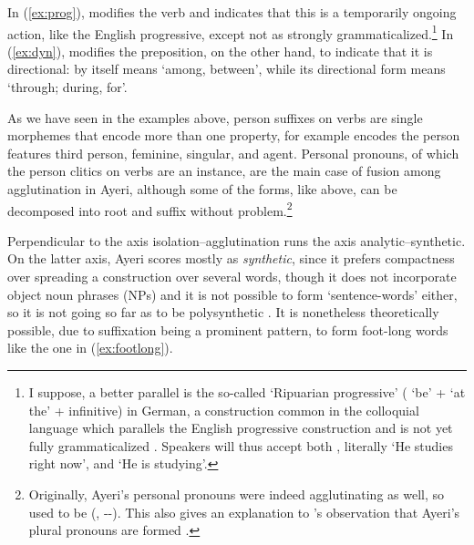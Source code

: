 In (\ref{ex:prog}),  modifies the verb 
and indicates that this is a temporarily ongoing action, like the English
progressive, except not as strongly grammaticalized.\footnote{I suppose, a
better parallel is the so-called  `Ripuarian
progressive' ( `be' +  `at the' + infinitive) in German, a
construction common in the colloquial language which parallels the English
progressive construction and is not yet fully grammaticalized
\citep[435]{dudengram2016}. Speakers will thus accept both , literally `He studies right now', and  `He is
studying'.
% 
}
%
In (\ref{ex:dyn}),  modifies the preposition, on the other
hand, to indicate that it is directional:  by itself means
`among, between', while its directional form  means
`through; during, for'.

As we have seen in the examples above, person suffixes on verbs are single 
morphemes that encode more than one property, for example  
encodes the person features third person, feminine, singular, and agent. 
Personal pronouns, of which the person clitics on 
verbs are an instance, are the main case of fusion among agglutination in 
Ayeri, although some of the forms, like  above, can 
be decomposed into root and suffix without problem.\footnote{Originally, 
Ayeri's personal pronouns were indeed agglutinating as well, so 
 used to be  (, 
\Tsg{}-\F{}-\Aarg{}). This also gives an explanation to \citet{boga2016}'s 
observation that Ayeri's plural pronouns are formed .}

Perpendicular to the axis isolation--agglutination runs the axis 
analytic--syn\-thetic. On the latter axis, Ayeri scores mostly as 
\emph{synthetic}, since it prefers compactness over spreading a construction 
over several words, though it does not incorporate object noun phrases (NPs) 
and it is not possible to form `sentence-words' either, so it is not going so 
far as to be poly\-syn\-thetic \citep[45--46]{comrie1989}. It is nonetheless 
theoretically possible, due to suffixation being a prominent pattern, to form 
foot-long words like the one in (\ref{ex:footlong}).

